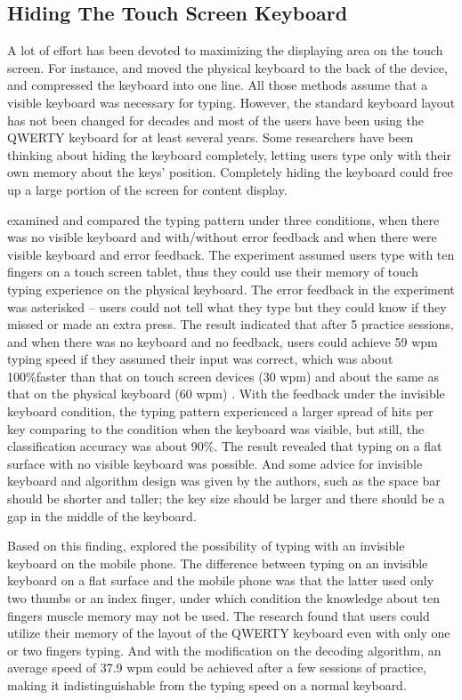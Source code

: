 \documentclass[11pt]{article}
\begin{document}
\subsection{Hiding The Touch Screen Keyboard}
A lot of effort has been devoted to maximizing the displaying area on the touch screen. For instance, \citet{10.1145/1851600.1851630} and \citet{10.1145/2212776.2223676} moved the physical keyboard to the back of the device, and \citet{10.1145/2047196.2047257} compressed the keyboard into one line. All those methods assume that a visible keyboard was necessary for typing. However, the standard keyboard layout has not been changed for decades and most of the users have been using the QWERTY keyboard for at least several years. Some researchers have been thinking about hiding the keyboard completely, letting users type only with their own memory about the keys' position. Completely hiding the keyboard could free up a large portion of the screen for content display.

\citet{10.1145/1978942.1979301} examined and compared the typing pattern under three conditions, when there was no visible keyboard and with/without error feedback and when there were visible keyboard and error feedback. The experiment assumed users type with ten fingers on a touch screen tablet, thus they could use their memory of touch typing experience on the physical keyboard. The error feedback in the experiment was asterisked -- users could not tell what they type but they could know if they missed or made an extra press. The result indicated that after 5 practice sessions, and when there was no keyboard and no feedback, users could achieve 59 wpm typing speed if they assumed their input was correct, which was about 100\%faster than that on touch screen devices (30 wpm) and about the same as that on the physical keyboard (60 wpm) \citep{10.1145/3173574.3174220}. With the feedback under the invisible keyboard condition, the typing pattern experienced a larger spread of hits per key comparing to the condition when the keyboard was visible, but still, the classification accuracy was about 90\%. The result revealed that typing on a flat surface with no visible keyboard was possible. And some advice for invisible keyboard and algorithm design was given by the authors, such as the space bar should be shorter and taller; the key size should be larger and there should be a gap in the middle of the keyboard.

Based on this finding, \citet{10.1145/3173574.3174013} explored the possibility of typing with an invisible keyboard on the mobile phone. The difference between typing on an invisible keyboard on a flat surface and the mobile phone was that the latter used only two thumbs or an index finger, under which condition the knowledge about ten fingers muscle memory may not be used. The research found that users could utilize their memory of the layout of the QWERTY keyboard even with only one or two fingers typing. And with the modification on the decoding algorithm, an average speed of 37.9 wpm could be achieved after a few sessions of practice, making it indistinguishable from the typing speed on a normal keyboard.
\end{document}
